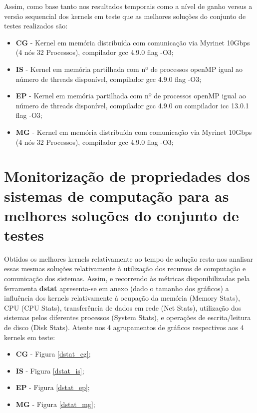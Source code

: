 \documentclass[conference,compsoc]{IEEEtran}
\begin{document}
Assim, como base tanto nos resultados temporais como a nível de ganho versus a versão sequencial dos kernels em teste que as melhores soluções do conjunto de testes realizados são:



\begin{itemize}
\item \textbf{CG} - Kernel em memória distribuída com comunicação via Myrinet 10Gbps (4 nós 32 Processos), compilador gcc 4.9.0 flag -O3;
\item \textbf{IS} - Kernel em memória partilhada com nº de processos openMP igual ao número de threads disponível, compilador gcc 4.9.0 flag -O3;
\item \textbf{EP} - Kernel em memória partilhada com nº de processos openMP igual ao número de threads disponível, compilador gcc 4.9.0 ou compilador icc 13.0.1 flag -O3;
\item \textbf{MG} - Kernel em memória distribuída com comunicação via Myrinet 10Gbps (4 nós 32 Processos), compilador gcc 4.9.0 flag -O3;

\end{itemize}

\section{Monitorização de propriedades dos sistemas de computação para as melhores soluções do conjunto de testes}

Obtidos os melhores kernels relativamente ao tempo de solução resta-nos analisar essas mesmas soluções relativamente à utilização dos recursos de computação e comunicação dos sistemas. Assim, e recorrendo às métricas disponibilizadas pela ferramenta \textbf{dstat} apresenta-se em anexo (dado o tamanho dos gráficos) a influência dos kernels relativamente à ocupação da memória (Memory Stats), CPU (CPU Stats), transferência de dados em rede (Net Stats), utilização dos sistemas pelos diferentes processos (System Stats), e operações de escrita/leitura de disco (Disk Stats). Atente nos 4 agrupamentos de gráficos respectivos aos 4 kernels em teste:

\begin{itemize}
\item \textbf{CG} - Figura \ref{dstat_cg};
\item \textbf{IS} - Figura \ref{dstat_is};
\item \textbf{EP} - Figura \ref{dstat_ep};
\item \textbf{MG} - Figura \ref{dstat_mg};

\end{itemize}
\end{document}
